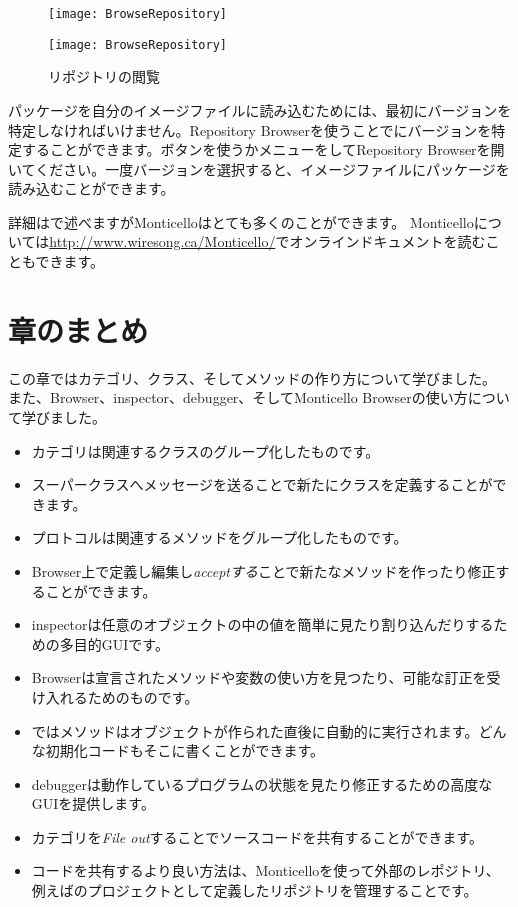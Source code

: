 \documentclass[a4paper,10pt,twoside]{book}
\begin{document}
\begin{figure}[hbt]
\ifluluelse
	{\centerline {\texttt{[image: BrowseRepository]}}}
	{\centerline {\texttt{[image: BrowseRepository]}}}
\caption{リポジトリの閲覧
}
\end{figure}


パッケージを自分のイメージファイルに読み込むためには、最初にバージョンを特定しなければいけません。Repository Browserを使うことでにバージョンを特定することができます。ボタンを使うかメニューを\actclick してRepository Browserを開いてください。一度バージョンを選択すると、イメージファイルにパッケージを読み込むことができます。


詳細はで述べますがMonticelloはとても多くのことができます。
Monticelloについては\url{http://www.wiresong.ca/Monticello/}でオンラインドキュメントを読むこともできます。

\section{章のまとめ}
この章ではカテゴリ、クラス、そしてメソッドの作り方について学びました。
また、Browser、inspector、debugger、そしてMonticello Browserの使い方について学びました。

\begin{itemize}
  \item カテゴリは関連するクラスのグループ化したものです。
  \item スーパークラスへメッセージを送ることで新たにクラスを定義することができます。
  \item プロトコルは関連するメソッドをグループ化したものです。
  \item Browser上で定義し編集し\emph{acceptする}ことで新たなメソッドを作ったり修正することができます。
  \item inspectorは任意のオブジェクトの中の値を簡単に見たり割り込んだりするための多目的GUIです。
  \item Browserは宣言されたメソッドや変数の使い方を見つたり、可能な訂正を受け入れるためのものです。
  \item \pharo ではメソッドはオブジェクトが作られた直後に自動的に実行されます。どんな初期化コードもそこに書くことができます。
  \item debuggerは動作しているプログラムの状態を見たり修正するための高度なGUIを提供します。
  \item カテゴリを\emph{File out}することでソースコードを共有することができます。
  \item コードを共有するより良い方法は、Monticelloを使って外部のレポジトリ、例えば\sqsrc のプロジェクトとして定義したリポジトリを管理することです。
\end{itemize}

\ifx\wholebook\relax\else
\end{document}

